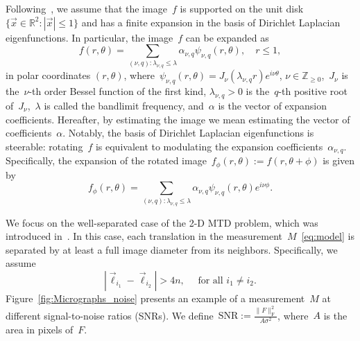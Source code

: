 \documentclass{article}
\begin{document}
Following~\cite{marshall2020image,bendory2021multi,kreymer2021two,zhao2013fourier}, we assume that the image~$f$ is supported on the unit disk \mbox{$\{\vec{x} \in \mathbb{R}^2: |\vec{x}| \le 1\}$}
and has a finite expansion in the basis of Dirichlet Laplacian eigenfunctions. In particular, the image~$f$ can be expanded as
\begin{equation}
\label{eq:expansion}
f (r, \theta) = \sum_{(\nu, q): \lambda_{\nu, q} \le \lambda} \alpha_{\nu, q} \psi_{\nu, q} (r, \theta), \quad r \le 1,
\end{equation}
in polar coordinates $(r, \theta)$, where~$\psi_{\nu, q}(r,\theta) = J_\nu\left( \lambda_{\nu, q} r \right) e^{i \nu \theta}$, \mbox{$\nu \in \mathbb{Z}_{\ge 0}$},~$J_\nu$ is the~\mbox{$\nu$-th} order Bessel function of the first kind, \mbox{$\lambda_{\nu, q} > 0$} is the~\mbox{$q$-th} positive root of~$J_\nu$,~$\lambda$ is called the bandlimit frequency, and~$\alpha$ is the vector of expansion coefficients. Hereafter, by estimating the image we mean estimating the vector of coefficients~$\alpha$. Notably, the basis of Dirichlet Laplacian eigenfunctions is steerable: rotating~$f$ is equivalent to modulating the expansion coefficients~$\alpha_{\nu, q}$. Specifically, the expansion of the rotated image~$f_\phi (r, \theta) := f(r, \theta + \phi)$ is given by
\begin{equation}
\label{eq:steering}
f_\phi (r, \theta) = \sum_{(\nu, q): \lambda_{\nu, q} \le \lambda} \alpha_{\nu, q} \psi_{\nu, q} (r, \theta) e^{i \nu \phi}.
\end{equation}

We focus on the \mbox{well-separated} case of the 2-D MTD problem, which was introduced in~\cite{marshall2020image, bendory2021multi}. In this case, each translation in the measurement~$M$~\eqref{eq:model} is separated by at least a full image diameter from its neighbors. Specifically, we assume
\begin{equation}
\label{eq:sep}
|\vec{\ell}_{i_1} - \vec{\ell}_{i_2}| > 4n, \quad \text{ for all } i_1 \ne i_2.
\end{equation}
Figure~\ref{fig:Micrographs_noise} presents an example of a measurement~$M$ at different signal-to-noise ratios (SNRs). We define~\mbox{$\text{SNR} := \frac{\|F\|_\text{F}^2}{A \sigma^2}$}, where~$A$ is the area in pixels of~$F$.
\end{document}
